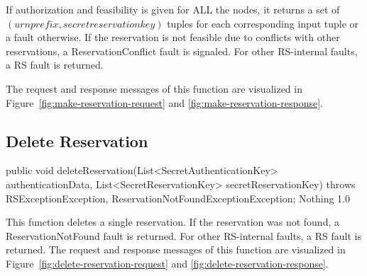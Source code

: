 \documentclass[a4paper,11pt]{article}
\begin{document}
If authorization and feasibility is given for ALL the nodes, it returns a set of $(urnprefix, secretreservationkey)$ tuples for each corresponding input tuple or a fault otherwise. If the reservation is not feasible due to conflicts with other reservations, a ReservationConflict fault is signaled. For other RS-internal faults, a RS fault is returned.

The request and response messages of this function are visualized in Figure~\ref{fig:make-reservation-request} and \ref{fig:make-reservation-response}.
	

			\sectionfin
			\subsection{Delete Reservation}

\begin{apidoc}
	{public void deleteReservation(List<SecretAuthenticationKey> authenticationData, List<SecretReservationKey> secretReservationKey) throws RSExceptionException, ReservationNotFoundExceptionException;} %
	{} %
	{
	} %
	{Nothing} %
	{} %
	{1.0} %
\end{apidoc}

This function deletes a single reservation. If the reservation was not found, a ReservationNotFound fault is returned.  For other RS-internal faults, a RS fault is returned. The request and response messages of this function are visualized in Figure~\ref{fig:delete-reservation-request} and \ref{fig:delete-reservation-response}.

		
			\sectionfin
\end{document}
